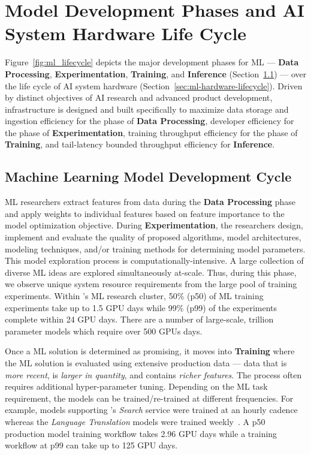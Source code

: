 \section{Model Development Phases and AI System Hardware Life Cycle}
\label{sec:model-life-cycle-analysis}


Figure~\ref{fig:ml_lifecycle} depicts the major development phases for ML --- \textbf{Data Processing}, \textbf{Experimentation}, \textbf{Training}, and \textbf{Inference} (Section~\ref{sec:ml-model-lifecycle}) --- over the life cycle of AI system hardware (Section~\ref{sec:ml-hardware-lifecycle}).
Driven by distinct objectives of AI research and advanced product development, infrastructure is designed and built specifically to maximize data storage and ingestion efficiency for the phase of \textbf{Data Processing}, developer efficiency for the phase of \textbf{Experimentation}, training throughput efficiency for the phase of \textbf{Training}, and tail-latency bounded throughput efficiency for \textbf{Inference}.


\subsection{Machine Learning Model Development Cycle}
\label{sec:ml-model-lifecycle}


ML researchers extract features from data during the \textbf {Data Processing} phase and apply weights to individual features based on feature importance to the model optimization objective.
During \textbf{Experimentation}, the researchers design, implement and evaluate the quality of proposed algorithms, model architectures, modeling techniques, and/or training methods for determining model parameters.
This model exploration process is computationally-intensive. A large collection of diverse ML ideas are explored simultaneously at-scale. 
Thus, during this phase, we observe unique system resource requirements from the large pool of training experiments. 
Within \fb's ML research cluster, 50\% (p50) of ML training experiments take up to 1.5 GPU days while 99\% (p99) of the experiments complete within 24 GPU days. There are a number of large-scale, trillion parameter models which require over 500 GPUs days.

Once a ML solution is determined as promising, it moves into \textbf{Training} where the ML solution is evaluated using extensive production data --- data that is \textit{more recent}, is \textit{larger in quantity}, and contains \textit{richer features}.
The process often requires additional hyper-parameter tuning. 
Depending on the ML task requirement, the models can be trained/re-trained at different frequencies. For example, models supporting \fb's \textit{Search} service were trained at an hourly cadence whereas the \textit{Language Translation} models were trained weekly~\cite{Hazelwood:hpca:2018}.
A p50 production model training workflow takes 2.96 GPU days while a training workflow at p99 can take up to 125 GPU days.

